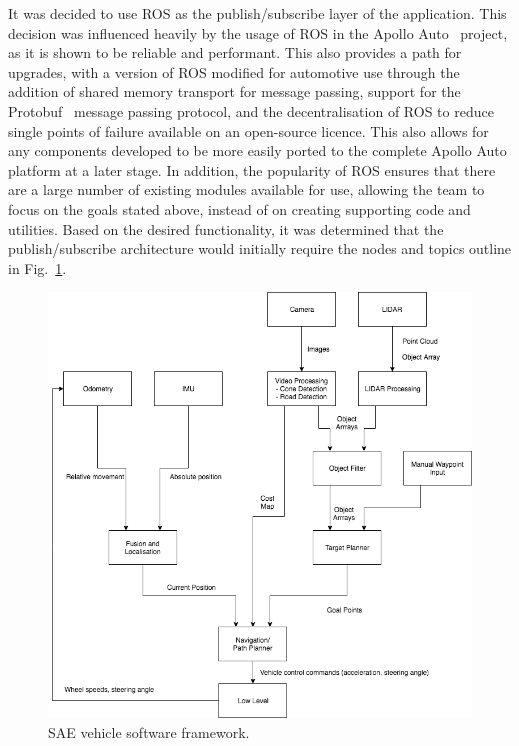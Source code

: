 It was decided to use ROS as the publish/subscribe layer of the application. This decision was influenced heavily by the usage of ROS in the Apollo Auto~\cite{baidu_apollo_nodate} project, as it is shown to be reliable and performant. This also provides a path for upgrades, with a version of ROS modified for automotive use through the addition of shared memory transport for message passing, support for the Protobuf~\cite{google_developers_protocol_nodate} message passing protocol, and the decentralisation of ROS to reduce single points of failure available on an open-source licence. This also allows for any components developed to be more easily ported to the complete Apollo Auto platform at a later stage. In addition, the popularity of ROS ensures that there are a large number of existing modules available for use, allowing the team to focus on the goals stated above, instead of on creating supporting code and utilities.
Based on the desired functionality, it was determined that the publish/subscribe architecture would initially require the nodes and topics outline in Fig.~\ref{fig:7:architecture}.

\begin{figure}[H]
	\centering
	\includegraphics[width=0.8\linewidth]{rosnodes}
	\caption{SAE vehicle software framework.}
	\label{fig:7:architecture}
\end{figure}

